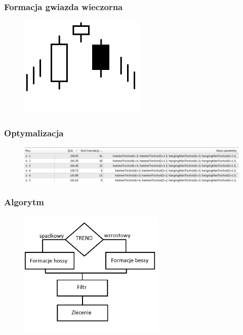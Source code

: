 \documentclass{beamer}
\begin{document}

\begin{frame}
\frametitle{Formacja gwiazda wieczorna}
\begin{figure}[ht]
\begin{center}
\includegraphics[width=6cm]{star.jpg}
\end{center}
\end{figure} 


\end{frame}


\begin{frame}
\frametitle{Optymalizacja}
\begin{figure}[ht]
\begin{center}
\includegraphics[width=12cm]{result.jpg}
\end{center}
\end{figure} 


\end{frame}


\begin{frame}
\frametitle{Algorytm}
\begin{figure}[ht]
\begin{center}
\includegraphics[width=7cm]{algorytm.jpg}
\end{center}
\end{figure} 


\end{frame}
\end{document}
